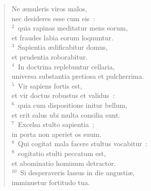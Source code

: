 \begin{flushleft}\begin{verse}\vspace{-19pt}\hspace{6pt}Ne \ae muleris viros malos,\\\hspace{6pt} nec desideres esse cum eis~:\\
${}^{2}$~quia rapinas meditatur mens eorum,\\ et fraudes labia eorum loquuntur.\\
${}^{3}$~Sapientia \ae dificabitur domus,\\ et prudentia roborabitur.\\
${}^{4}$~In doctrina replebuntur cellaria,\\ universa substantia pretiosa et pulcherrima.\\
${}^{5}$~Vir sapiens fortis est,\\ et vir doctus robustus et validus~:\\
${}^{6}$~quia cum dispositione initur bellum,\\ et erit salus ubi multa consilia sunt.\\
${}^{7}$~Excelsa stulto sapientia~;\\ in porta non aperiet os suum.\\
${}^{8}$~Qui cogitat mala facere stultus vocabitur~:\\
${}^{9}$~cogitatio stulti peccatum est,\\ et abominatio hominum detractor.\\
${}^{10}$~Si desperaveris lassus in die angusti\ae ,\\ imminuetur fortitudo tua.\end{verse}\end{flushleft}



